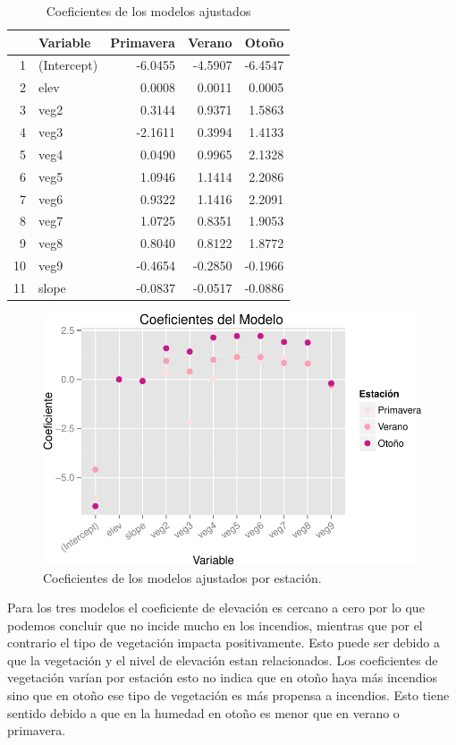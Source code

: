\documentclass[12,]{article}
\begin{document}
\begin{table}[ht]
\centering
\begin{tabular}{rlrrr}
  \hline
 & Variable & Primavera & Verano & Otoño \\ 
  \hline
1 & (Intercept) & -6.0455 & -4.5907 & -6.4547 \\ 
  2 & elev & 0.0008 & 0.0011 & 0.0005 \\ 
  3 & veg2 & 0.3144 & 0.9371 & 1.5863 \\ 
  4 & veg3 & -2.1611 & 0.3994 & 1.4133 \\ 
  5 & veg4 & 0.0490 & 0.9965 & 2.1328 \\ 
  6 & veg5 & 1.0946 & 1.1414 & 2.2086 \\ 
  7 & veg6 & 0.9322 & 1.1416 & 2.2091 \\ 
  8 & veg7 & 1.0725 & 0.8351 & 1.9053 \\ 
  9 & veg8 & 0.8040 & 0.8122 & 1.8772 \\ 
  10 & veg9 & -0.4654 & -0.2850 & -0.1966 \\ 
  11 & slope & -0.0837 & -0.0517 & -0.0886 \\ 
   \hline
\end{tabular}
\caption{Coeficientes de los modelos ajustados} 
\end{table}

\begin{figure}[htbp]
\centering
\includegraphics{tarea2_files/figure-latex/unnamed-chunk-16-1.pdf}
\caption{Coeficientes de los modelos ajustados por estación.}
\end{figure}

Para los tres modelos el coeficiente de elevación es cercano a cero por
lo que podemos concluir que no incide mucho en los incendios, mientras
que por el contrario el tipo de vegetación impacta positivamente. Esto
puede ser debido a que la vegetación y el nivel de elevación estan
relacionados. Los coeficientes de vegetación varían por estación esto no
indica que en otoño haya más incendios sino que en otoño ese tipo de
vegetación es más propensa a incendios. Esto tiene sentido debido a que
en la humedad en otoño es menor que en verano o primavera.
\end{document}
